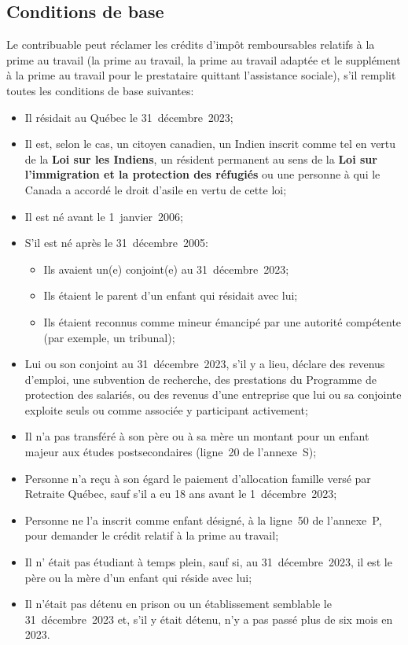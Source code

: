 \subsection{Conditions de base}
Le contribuable peut réclamer les crédits d'impôt remboursables relatifs à la prime au travail (la prime au travail, la prime au travail adaptée et le supplément à la prime au travail pour le prestataire quittant l'assistance sociale), s'il remplit toutes les conditions de base suivantes:
\begin{itemize}
	\item Il résidait au Québec le 31~décembre~2023;
	\item Il est, selon le cas, un citoyen canadien, un Indien inscrit comme tel en vertu de la \textbf{Loi sur les Indiens}, un résident permanent au sens de la \textbf{Loi sur l'immigration et la protection des réfugiés} ou une personne à qui le Canada a accordé le droit d'asile en vertu de cette loi;
	\item Il est né avant le 1\ier{}~janvier~2006;
	\item S'il est né après le 31~décembre~2005:
	\begin{itemize}
		\item Ils avaient un(e) conjoint(e) au 31~décembre~2023;
		\item Ils étaient le parent d'un enfant qui résidait avec lui;
		\item Ils étaient reconnus comme mineur émancipé par une autorité compétente (par exemple, un tribunal);
	\end{itemize}
	\item Lui ou son conjoint au 31~décembre~2023, s'il y a lieu, déclare des revenus d'emploi, une subvention de recherche, des prestations du Programme de protection des salariés, ou des revenus d'une entreprise que lui ou sa conjointe exploite seuls ou comme associée y participant activement;
	\item Il n'a pas transféré à son père ou à sa mère un montant pour un enfant majeur aux études postsecondaires (ligne~20 de l'annexe~S);
	\item Personne n'a reçu à son égard le paiement d'allocation famille versé par Retraite Québec, sauf s'il a eu 18 ans avant le 1\ier{}~décembre~2023;
	\item Personne ne l'a inscrit comme enfant désigné, à la ligne~50 de l'annexe~P, pour demander le crédit relatif à la prime au travail;
	\item Il n' était pas étudiant à temps plein, sauf si, au 31~décembre~2023, il est le père ou la mère d'un enfant qui réside avec lui;
	\item Il n'était pas détenu en prison ou un établissement semblable le 31~décembre~2023 et, s'il y était détenu, n'y a pas passé plus de six mois en 2023.
\end{itemize}

